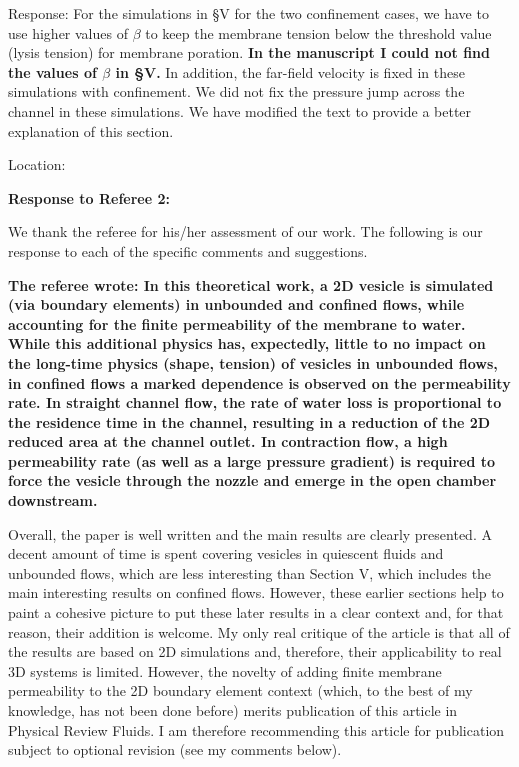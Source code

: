 \documentclass[12pt]{article}
\begin{document}
\begin{enumerate}
\noindent
Response:  For the simulations in \S V for the two confinement cases, we have to use higher values of $\beta$ to keep the membrane tension below the threshold value (lysis tension) for membrane poration. {\bf In the manuscript I could not find the values of $\beta$ in \S V.} In addition, the far-field velocity is fixed in these simulations with confinement. We did not fix the pressure jump across the channel in these simulations. We have modified the text to provide a better explanation of this section.

\noindent
Location:

\end{enumerate}

\newpage
\vspace{0.5cm}
{\large \bf Response to Referee 2:}
\vspace{0.5cm}

We thank the referee for his/her assessment of our work.  
The following is
our response to each of the specific comments and suggestions.

{\bf The referee wrote:
In this theoretical work, a 2D vesicle is simulated (via boundary elements) in unbounded and confined flows, while accounting for the finite permeability of the membrane to water. While this additional physics has, expectedly, little to no impact on the long-time physics (shape, tension) of vesicles in unbounded flows, in confined flows a marked dependence is observed on the permeability rate. In straight channel flow, the rate of water loss is proportional to the residence time in the channel, resulting in a reduction of the 2D reduced area at the channel outlet. In contraction flow, a high permeability rate (as well as a large pressure gradient) is required to force the vesicle through the nozzle and emerge in the open chamber downstream.

Overall, the paper is well written and the main results are clearly presented. A decent amount of time is spent covering vesicles in quiescent fluids and unbounded flows, which are less interesting than Section V, which includes the main interesting results on confined flows. However, these earlier sections help to paint a cohesive picture to put these later results in a clear context and, for that reason, their addition is welcome. My only real critique of the article is that all of the results are based on 2D simulations and, therefore, their applicability to real 3D systems is limited. However, the novelty of adding finite membrane permeability to the 2D boundary element context (which, to the best of my knowledge, has not been done before) merits publication of this article in Physical Review Fluids. I am therefore recommending this article for publication subject to optional revision (see my comments below).}
\end{document}
